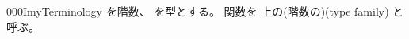 \documentclass[index]{subfiles}
\begin{document}
\begin{myBlock}{000I}{myTerminology}
  を階数、
  を型とする。
  関数を
  上の(階数の)(type family)
  と呼ぶ。
\end{myBlock}
\end{document}
